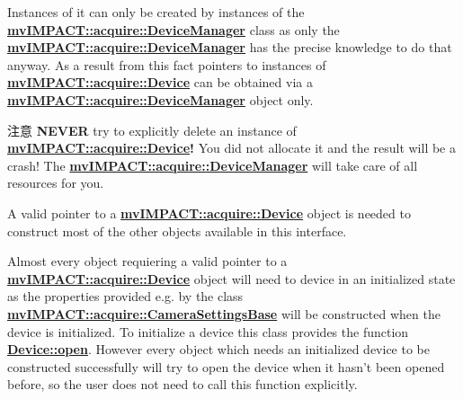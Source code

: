 Instances of it can only be created by instances of the {\bfseries \hyperlink{classmv_i_m_p_a_c_t_1_1acquire_1_1_device_manager}{mv\+I\+M\+P\+A\+C\+T\+::acquire\+::\+Device\+Manager}} class as only the {\bfseries \hyperlink{classmv_i_m_p_a_c_t_1_1acquire_1_1_device_manager}{mv\+I\+M\+P\+A\+C\+T\+::acquire\+::\+Device\+Manager}} has the precise knowledge to do that anyway. As a result from this fact pointers to instances of {\bfseries \hyperlink{classmv_i_m_p_a_c_t_1_1acquire_1_1_device}{mv\+I\+M\+P\+A\+C\+T\+::acquire\+::\+Device}} can be obtained via a {\bfseries \hyperlink{classmv_i_m_p_a_c_t_1_1acquire_1_1_device_manager}{mv\+I\+M\+P\+A\+C\+T\+::acquire\+::\+Device\+Manager}} object only.

\begin{DoxyAttention}{注意}
{\bfseries N\+E\+V\+E\+R} try to explicitly delete an instance of {\bfseries \hyperlink{classmv_i_m_p_a_c_t_1_1acquire_1_1_device}{mv\+I\+M\+P\+A\+C\+T\+::acquire\+::\+Device}!} You did not allocate it and the result will be a crash! The {\bfseries \hyperlink{classmv_i_m_p_a_c_t_1_1acquire_1_1_device_manager}{mv\+I\+M\+P\+A\+C\+T\+::acquire\+::\+Device\+Manager}} will take care of all resources for you.
\end{DoxyAttention}
A valid pointer to a {\bfseries \hyperlink{classmv_i_m_p_a_c_t_1_1acquire_1_1_device}{mv\+I\+M\+P\+A\+C\+T\+::acquire\+::\+Device}} object is needed to construct most of the other objects available in this interface.

Almost every object requiering a valid pointer to a {\bfseries \hyperlink{classmv_i_m_p_a_c_t_1_1acquire_1_1_device}{mv\+I\+M\+P\+A\+C\+T\+::acquire\+::\+Device}} object will need to device in an initialized state as the properties provided e.\+g. by the class {\bfseries \hyperlink{classmv_i_m_p_a_c_t_1_1acquire_1_1_camera_settings_base}{mv\+I\+M\+P\+A\+C\+T\+::acquire\+::\+Camera\+Settings\+Base}} will be constructed when the device is initialized. To initialize a device this class provides the function {\bfseries \hyperlink{classmv_i_m_p_a_c_t_1_1acquire_1_1_device_adf4cb4c232b202a51c7161caf9b36165}{Device\+::open}}. However every object which needs an initialized device to be constructed successfully will try to open the device when it hasn't been opened before, so the user does not need to call this function explicitly.

